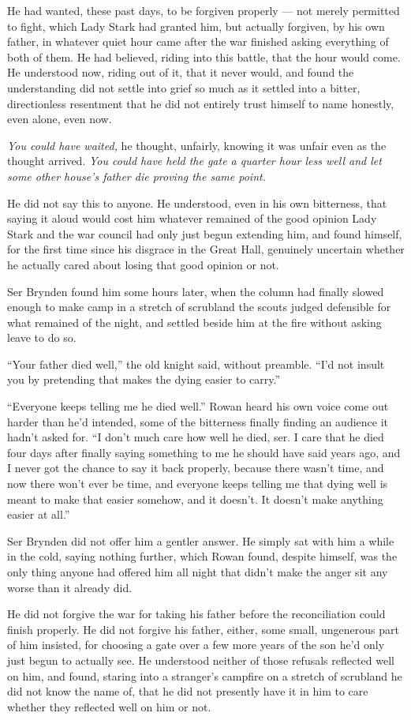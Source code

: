 He had wanted, these past days, to be forgiven properly — not merely permitted to fight, which Lady Stark had granted him, but actually forgiven, by his own father, in whatever quiet hour came after the war finished asking everything of both of them. He had believed, riding into this battle, that the hour would come. He understood now, riding out of it, that it never would, and found the understanding did not settle into grief so much as it settled into a bitter, directionless resentment that he did not entirely trust himself to name honestly, even alone, even now.

\textit{You could have waited,} he thought, unfairly, knowing it was unfair even as the thought arrived. \textit{You could have held the gate a quarter hour less well and let some other house’s father die proving the same point.}

He did not say this to anyone. He understood, even in his own bitterness, that saying it aloud would cost him whatever remained of the good opinion Lady Stark and the war council had only just begun extending him, and found himself, for the first time since his disgrace in the Great Hall, genuinely uncertain whether he actually cared about losing that good opinion or not.

\sceneBreak

Ser Brynden found him some hours later, when the column had finally slowed enough to make camp in a stretch of scrubland the scouts judged defensible for what remained of the night, and settled beside him at the fire without asking leave to do so.

“Your father died well,” the old knight said, without preamble. “I’d not insult you by pretending that makes the dying easier to carry.”

“Everyone keeps telling me he died well.” Rowan heard his own voice come out harder than he’d intended, some of the bitterness finally finding an audience it hadn’t asked for. “I don’t much care how well he died, ser. I care that he died four days after finally saying something to me he should have said years ago, and I never got the chance to say it back properly, because there wasn’t time, and now there won’t ever be time, and everyone keeps telling me that dying well is meant to make that easier somehow, and it doesn’t. It doesn’t make anything easier at all.”

Ser Brynden did not offer him a gentler answer. He simply sat with him a while in the cold, saying nothing further, which Rowan found, despite himself, was the only thing anyone had offered him all night that didn’t make the anger sit any worse than it already did.

He did not forgive the war for taking his father before the reconciliation could finish properly. He did not forgive his father, either, some small, ungenerous part of him insisted, for choosing a gate over a few more years of the son he’d only just begun to actually see. He understood neither of those refusals reflected well on him, and found, staring into a stranger’s campfire on a stretch of scrubland he did not know the name of, that he did not presently have it in him to care whether they reflected well on him or not.